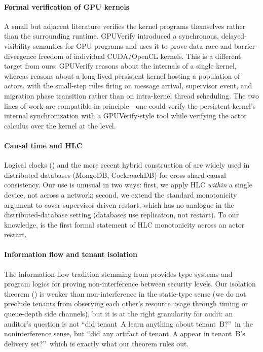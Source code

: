 \paragraph{Formal verification of GPU kernels}
A small but adjacent literature verifies the kernel programs
themselves rather than the surrounding runtime.  GPUVerify
\citep{betts2012gpuverify} introduced a synchronous,
delayed-visibility semantics for GPU programs and uses it to prove
data-race and barrier-divergence freedom of individual CUDA/OpenCL
kernels.  This is a different target from ours: GPUVerify reasons
about the internals of a single kernel, whereas \system{} reasons
about a long-lived persistent kernel hosting a population of
actors, with the small-step rules firing on message arrival,
supervisor event, and migration phase transition rather than on
intra-kernel thread scheduling.  The two lines of work are
compatible in principle—one could verify the persistent kernel's
internal synchronization with a GPUVerify-style tool while
verifying the actor calculus over the kernel at the \TLA{} level.

\paragraph{Causal time and HLC}
Logical clocks (\citet{lamport1978clocks}) and the more recent
hybrid construction of \citet{kulkarni2014hlc} are widely used in
distributed databases (MongoDB, CockroachDB) for cross-shard
causal consistency.  Our use is unusual in two ways: first, we apply
HLC \emph{within} a single device, not across a network; second,
we extend the standard monotonicity argument to cover supervisor-driven
restart, which has no analogue in the distributed-database setting
(databases use replication, not restart).  To our knowledge,
 is the first formal statement of
HLC monotonicity across an actor restart.

\paragraph{Information flow and tenant isolation}
The information-flow tradition stemming from
\citet{sabelfeld2003language} provides type systems and program
logics for proving non-interference between security levels.  Our
isolation theorem () is weaker than
non-interference in the static-type sense (we do not preclude
tenants from observing each other's resource usage through timing
or queue-depth side channels), but it is at the right granularity
for audit: an auditor's question is not ``did tenant~A learn
anything about tenant~B?''\ in the noninterference sense, but
``did any artifact of tenant~A appear in tenant~B's
delivery set?''\ which is exactly what our theorem rules out.

